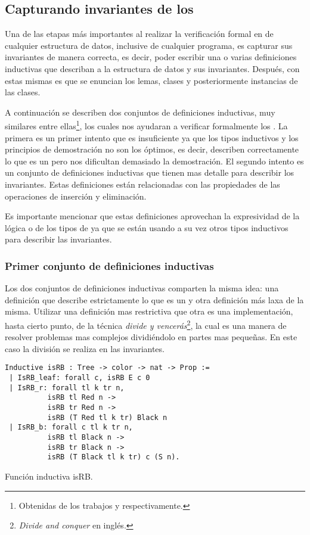 \subsection{Capturando invariantes de los {\arns}}
Una de las etapas m\'as importantes al realizar la verificaci\'on formal en {\coq} de cualquier estructura de
datos, inclusive de cualquier programa, es capturar sus invariantes de manera correcta, es decir,
poder escribir una o varias definiciones inductivas que describan a la estructura de datos y sus
invariantes. Después, con estas mismas es que se enuncian los lemas, clases y posteriormente
instancias de las clases.

A continuaci\'on se describen dos conjuntos de definiciones inductivas, muy similares entre 
ellas\footnote{Obtenidas de los trabajos \cite{tesisG} y \cite{MSetRBT} respectivamente.},
los cuales nos ayudaran a verificar formalmente los {\arns}. La primera es un primer intento que es
insuficiente ya que los tipos inductivos y los principios de demostraci\'on no son los \'optimos, es decir, 
describen correctamente lo que es un {\arn} pero nos dificultan demasiado la demostraci\'on.
El segundo intento es un conjunto de definiciones inductivas que tienen mas detalle para describir
los invariantes. Estas definiciones est\'an relacionadas con las propiedades de las operaciones de
inserci\'on y eliminaci\'on.

Es importante mencionar que estas definiciones aprovechan la expresividad de la lógica o de 
los tipos de {\coq} ya que se est\'an usando a su vez otros tipos inductivos para describir las invariantes.

\subsubsection{Primer conjunto de definiciones inductivas}
Los dos conjuntos de definiciones inductivas comparten la misma idea: una definici\'on que describe
estrictamente lo que es un {\arn} y otra definici\'on m\'as laxa de la misma. Utilizar una definici\'on
mas restrictiva que otra es una implementaci\'on, hasta cierto punto, de la t\'ecnica 
\textit{divide y vencerás}\footnote{\textit{Divide and conquer} en ingl\'es.}, la cual es una manera 
de resolver problemas mas complejos dividiéndolo en partes mas pequeñas. En este caso la división se realiza en las invariantes.

\begin{listing}[!ht]
\centering
\captionsetup{justification=centering}
\begin{verbatim}
Inductive isRB : Tree -> color -> nat -> Prop :=
 | IsRB_leaf: forall c, isRB E c 0
 | IsRB_r: forall tl k tr n,
          isRB tl Red n ->
          isRB tr Red n ->
          isRB (T Red tl k tr) Black n
 | IsRB_b: forall c tl k tr n,
          isRB tl Black n ->
          isRB tr Black n ->
          isRB (T Black tl k tr) c (S n).
\end{verbatim}
\caption{Funci\'on inductiva isRB.}
\label{inductive_isRB}
\end{listing}

